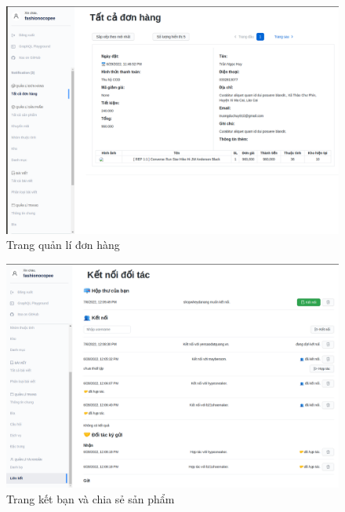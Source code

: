 \clearpage
\FloatBarrier
\begin{figure}[!htbp]\fontsize{13px}{13px}\selectfont
	\begin{center}	
		\includegraphics[width=\textwidth]{./results/order}
		\caption{Trang quản lí đơn hàng}
	\end{center}
\end{figure}
\clearpage
\FloatBarrier
\begin{figure}[!htbp]\fontsize{13px}{13px}\selectfont
	\begin{center}	
		\includegraphics[width=\textwidth]{./results/contract}
		\caption{Trang kết bạn và chia sẻ sản phẩm}
	\end{center}
\end{figure}
\clearpage
\FloatBarrier

